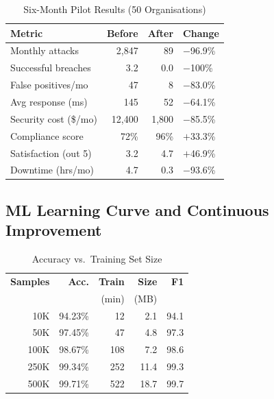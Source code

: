 \documentclass[10pt,twocolumn]{article}
\begin{document}
\begin{table}[H]
\centering
\caption{Six-Month Pilot Results (50 Organisations)}
\label{tab:deploy}
\small
\setlength{\tabcolsep}{4pt}
\begin{tabular}{@{}lrrl@{}}
\toprule
\textbf{Metric} & \textbf{Before} & \textbf{After} & \textbf{Change} \\
\midrule
Monthly attacks     & 2,847  &    89  & $-$96.9\% \\
Successful breaches &   3.2  &   0.0  & $-$100\%  \\
False positives/mo  &    47  &     8  & $-$83.0\% \\
Avg response (ms)   &   145  &    52  & $-$64.1\% \\
Security cost (\$/mo)& 12,400& 1,800  & $-$85.5\% \\
Compliance score    &  72\%  &  96\%  & $+$33.3\% \\
Satisfaction (out 5)&  3.2   &   4.7  & $+$46.9\% \\
Downtime (hrs/mo)   &   4.7  &   0.3  & $-$93.6\% \\
\bottomrule
\end{tabular}
\end{table}

\subsection{ML Learning Curve and Continuous Improvement}

\begin{table}[H]
\centering
\caption{Accuracy vs.\ Training Set Size}
\label{tab:learning}
\small
\setlength{\tabcolsep}{4pt}
\begin{tabular}{@{}rrrrr@{}}
\toprule
\textbf{Samples} & \textbf{Acc.} & \textbf{Train} & \textbf{Size} & \textbf{F1} \\
                 &               & (min)          & (MB)          &             \\
\midrule
 10K & 94.23\% &  12 &  2.1 & 94.1 \\
 50K & 97.45\% &  47 &  4.8 & 97.3 \\
100K & 98.67\% & 108 &  7.2 & 98.6 \\
250K & 99.34\% & 252 & 11.4 & 99.3 \\
500K & 99.71\% & 522 & 18.7 & 99.7 \\
\bottomrule
\end{tabular}
\end{table}
\end{document}
